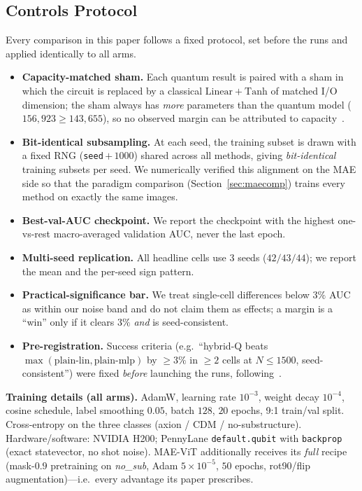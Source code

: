 \documentclass[10pt,letterpaper]{article}
\theoremstyle{plain}
\theoremstyle{definition}
\begin{document}
\subsection{Controls Protocol}
\label{sec:controls}

Every comparison in this paper follows a fixed protocol, set before the runs and
applied identically to all arms.
\begin{itemize}
  \item \textbf{Capacity-matched sham.} Each quantum result is paired with a sham
        in which the circuit is replaced by a classical $\mathrm{Linear}+\mathrm{Tanh}$
        of matched I/O dimension; the sham always has \emph{more} parameters than
        the quantum model ($156{,}923 \geq 143{,}655$), so no observed margin can be
        attributed to capacity~\cite{bowles2024}.
  \item \textbf{Bit-identical subsampling.} At each seed, the training subset is
        drawn with a fixed RNG (\texttt{seed}\,$+\,1000$) shared across all methods,
        giving \emph{bit-identical} training subsets per seed. We numerically
        verified this alignment on the MAE side so that the paradigm comparison
        (Section~\ref{sec:maecomp}) trains every method on exactly the same images.
  \item \textbf{Best-val-AUC checkpoint.} We report the checkpoint with the highest
        one-vs-rest macro-averaged validation AUC, never the last epoch.
  \item \textbf{Multi-seed replication.} All headline cells use $3$ seeds
        ($42/43/44$); we report the mean and the per-seed sign pattern.
  \item \textbf{Practical-significance bar.} We treat single-cell differences below
        $3\%$ AUC as within our noise band and do not claim them as effects; a
        margin is a ``win'' only if it clears $3\%$ \emph{and} is seed-consistent.
  \item \textbf{Pre-registration.} Success criteria (e.g.\ ``hybrid-Q beats
        $\max(\text{plain-lin},\text{plain-mlp})$ by $\geq 3\%$ in $\geq 2$ cells at
        $N\leq1500$, seed-consistent'') were fixed \emph{before} launching the runs,
        following~\cite{schnabel2025}.
\end{itemize}

\textbf{Training details (all arms).} AdamW, learning rate $10^{-3}$, weight decay
$10^{-4}$, cosine schedule, label smoothing $0.05$, batch $128$, $20$ epochs, 9:1
train/val split. Cross-entropy on the three classes (axion / CDM / no-substructure).
Hardware/software: NVIDIA H200; PennyLane \texttt{default.qubit} with
\texttt{backprop} (exact statevector, no shot noise). MAE-ViT additionally receives
its \emph{full} recipe (mask-$0.9$ pretraining on \emph{no\_sub}, Adam $5\times10^{-5}$,
$50$ epochs, rot90/flip augmentation)---i.e.\ every advantage its paper prescribes.
\end{document}
